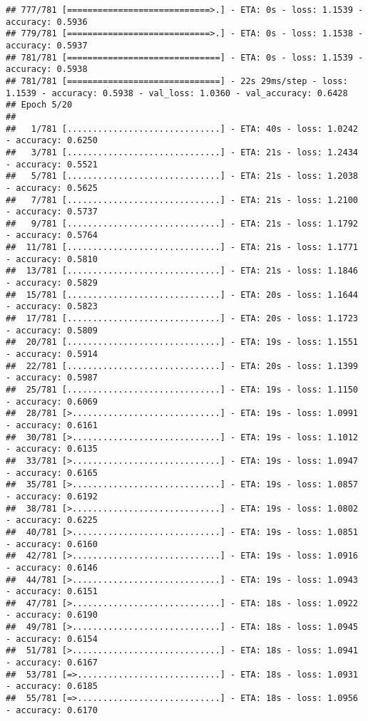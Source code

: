 \documentclass[
]{article}
\begin{document}
\begin{verbatim}
## 777/781 [============================>.] - ETA: 0s - loss: 1.1539 - accuracy: 0.5936
## 779/781 [============================>.] - ETA: 0s - loss: 1.1538 - accuracy: 0.5937
## 781/781 [==============================] - ETA: 0s - loss: 1.1539 - accuracy: 0.5938
## 781/781 [==============================] - 22s 29ms/step - loss: 1.1539 - accuracy: 0.5938 - val_loss: 1.0360 - val_accuracy: 0.6428
## Epoch 5/20
## 
##   1/781 [..............................] - ETA: 40s - loss: 1.0242 - accuracy: 0.6250
##   3/781 [..............................] - ETA: 21s - loss: 1.2434 - accuracy: 0.5521
##   5/781 [..............................] - ETA: 21s - loss: 1.2038 - accuracy: 0.5625
##   7/781 [..............................] - ETA: 21s - loss: 1.2100 - accuracy: 0.5737
##   9/781 [..............................] - ETA: 21s - loss: 1.1792 - accuracy: 0.5764
##  11/781 [..............................] - ETA: 21s - loss: 1.1771 - accuracy: 0.5810
##  13/781 [..............................] - ETA: 21s - loss: 1.1846 - accuracy: 0.5829
##  15/781 [..............................] - ETA: 20s - loss: 1.1644 - accuracy: 0.5823
##  17/781 [..............................] - ETA: 20s - loss: 1.1723 - accuracy: 0.5809
##  20/781 [..............................] - ETA: 19s - loss: 1.1551 - accuracy: 0.5914
##  22/781 [..............................] - ETA: 20s - loss: 1.1399 - accuracy: 0.5987
##  25/781 [..............................] - ETA: 19s - loss: 1.1150 - accuracy: 0.6069
##  28/781 [>.............................] - ETA: 19s - loss: 1.0991 - accuracy: 0.6161
##  30/781 [>.............................] - ETA: 19s - loss: 1.1012 - accuracy: 0.6135
##  33/781 [>.............................] - ETA: 19s - loss: 1.0947 - accuracy: 0.6165
##  35/781 [>.............................] - ETA: 19s - loss: 1.0857 - accuracy: 0.6192
##  38/781 [>.............................] - ETA: 19s - loss: 1.0802 - accuracy: 0.6225
##  40/781 [>.............................] - ETA: 19s - loss: 1.0851 - accuracy: 0.6160
##  42/781 [>.............................] - ETA: 19s - loss: 1.0916 - accuracy: 0.6146
##  44/781 [>.............................] - ETA: 19s - loss: 1.0943 - accuracy: 0.6151
##  47/781 [>.............................] - ETA: 18s - loss: 1.0922 - accuracy: 0.6190
##  49/781 [>.............................] - ETA: 18s - loss: 1.0945 - accuracy: 0.6154
##  51/781 [>.............................] - ETA: 18s - loss: 1.0941 - accuracy: 0.6167
##  53/781 [=>............................] - ETA: 18s - loss: 1.0931 - accuracy: 0.6185
##  55/781 [=>............................] - ETA: 18s - loss: 1.0956 - accuracy: 0.6170

\end{verbatim}
\end{document}
